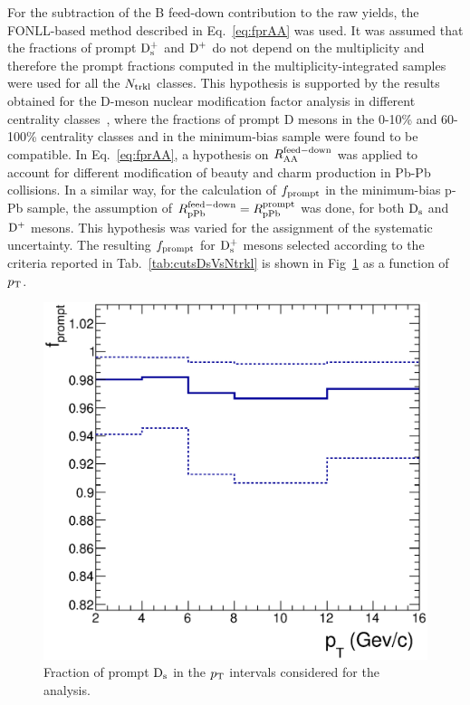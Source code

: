 For the subtraction of the B feed-down contribution to the raw yields, the FONLL-based method 
described in Eq.~\ref{eq:fprAA} was used. It was 
assumed that the fractions of prompt ${\rm D_s^+}$ and ${\rm D^+}$ do not depend on the 
multiplicity and therefore the prompt fractions computed in 
the multiplicity-integrated samples were used for all the $N_{\rm trkl}$ classes. 
This hypothesis is supported by the results obtained for the D-meson nuclear modification factor 
analysis in different centrality classes~\cite{ALICEPAS2017008}, 
where the fractions of prompt D mesons in the 0-10\% and 60-100\%
centrality classes and in the minimum-bias sample were found to be compatible. 
In Eq.~\ref{eq:fprAA}, a hypothesis on $R_{\rm AA}^{\rm feed-down}$
was applied to account for different modification of beauty and charm 
production in Pb-Pb collisions. In a similar way, for the calculation of $f_{\rm prompt}$ in 
the minimum-bias p-Pb sample, the assumption of $R_{\rm pPb}^{\rm feed-down} = R_{\rm pPb}^{\rm prompt}$ 
was done, for both ${\rm D_s}$ and ${\rm D^+}$ mesons.
This hypothesis was varied for the assignment of the systematic uncertainty. 
The resulting $f_{\rm prompt}$ for ${\rm D_s^+}$ mesons selected according to the criteria reported
in Tab.~\ref{tab:cutsDsVsNtrkl} is shown in Fig~\ref{fig:DsfPrompt} as a function of $p_{\rm T}$.

\begin{figure}[!h]
\centering
 \includegraphics[width=.6\textwidth]{FigCap6/DsFPrompt.eps}
  \caption{Fraction of prompt ${\rm D_s}$ in the $p_{\rm T}$ intervals considered for the analysis.}
 \label{fig:DsfPrompt}
\end{figure}

